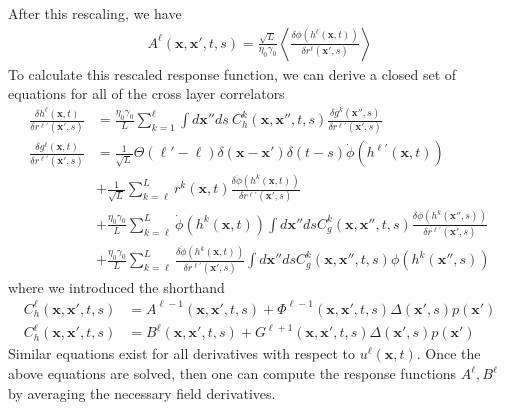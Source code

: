 \documentclass{article} %
\def\x{\bm x}
\begin{document}
After this rescaling, we have
\begin{align}
    A^\ell(\x,\x',t,s) = \frac{\sqrt{L}}{\eta_0\gamma_0} \left< \frac{\delta\phi(h^\ell(\x,t))}{\delta r^\ell(\x',s)} \right>
\end{align}
To calculate this rescaled response function, we can derive a closed set of equations for all of the cross layer correlators
\begin{align}
    \frac{\delta h^\ell(\x,t)}{\delta r^{\ell'}(\x',s)} &= \frac{\eta_0 \gamma_0}{L} \sum_{k=1}^\ell \int d\x''  ds \ C_h^k(\x,\x'',t,s) \frac{\delta g^k(\x'',s)}{\delta r^{\ell'}(\x',s)} \nonumber
    \\
    \frac{\delta g^\ell(\x,t)}{\delta r^{\ell'}(\x',s)} &= \frac{1}{\sqrt L} \Theta( \ell' - \ell ) \delta(\x-\x') \delta(t-s) \dot\phi(h^{\ell'}(\x,t)) \nonumber
    \\
    &+  \frac{1}{\sqrt L} \sum_{k=\ell}^{L} r^k(\x,t)  \frac{\delta \dot\phi(h^k(\x,t))}{\delta r^{\ell'}(\x',s)} \nonumber
    \\
    &+ \frac{\eta_0 \gamma_0}{L} \sum_{k=\ell}^{L} \dot\phi(h^k(\x,t)) \int d\x'' ds C_g^k(\x,\x'',t,s) \frac{\delta \phi(h^k(\x'',s))}{\delta r^{\ell'}(\x',s)} \nonumber
    \\
    &+ \frac{\eta_0 \gamma_0}{L} \sum_{k=\ell}^{L} \frac{\delta \dot\phi(h^k(\x,t))}{\delta r^{\ell'}(\x',s)} \int d\x'' ds C_g^k(\x,\x'',t,s) \phi(h^k(\x'',s))
\end{align}
where we introduced the shorthand
\begin{align}
    C_h^\ell(\x,\x',t,s) &= A^{\ell-1}(\x, \x',t,s) + \Phi^{\ell-1}(\x,\x',t,s) \Delta(\x',s) p(\x') \nonumber
    \\
    C_h^\ell(\x,\x',t,s) &= B^{\ell}(\x, \x',t,s) + G^{\ell+1}(\x,\x',t,s) \Delta(\x',s) p(\x')
\end{align}
Similar equations exist for all derivatives with respect to $u^\ell(\x,t)$. Once the above equations are solved, then one can compute the response functions $A^\ell, B^\ell$ by averaging the necessary field derivatives.
\end{document}
